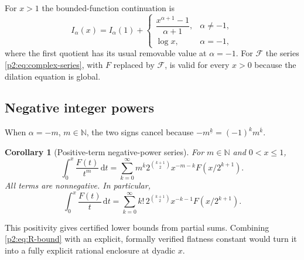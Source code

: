 \documentclass[11pt,oneside]{article}
\newtheorem{corollary}[theorem]{Corollary}
\theoremstyle{definition}
\theoremstyle{remark}
\newcommand{\N}{\mathbb N}
\newcommand{\dd}{\,\mathrm d}
\newcommand{\fall}[2]{#1^{\underline{#2}}}
\newcommand{\rise}[2]{#1^{\overline{#2}}}
\newcommand{\1}{\mathbf 1}
\begin{document}
For $x>1$ the bounded-function continuation is
\begin{equation}
 I_\alpha(x)=I_\alpha(1)+
 \begin{cases}
 \dfrac{x^{\alpha+1}-1}{\alpha+1},&\alpha\ne-1,\\[6pt]
 \log x,&\alpha=-1,
 \end{cases}                                               \label{p2:eq:Ialpha-outside}
\end{equation}
where the first quotient has its usual removable value at $\alpha=-1$.  For
$\mathcal F$ the series \eqref{p2:eq:complex-series}, with $F$ replaced by
$\mathcal F$, is valid for every $x>0$ because the dilation equation is global.

\subsection{Negative integer powers}
When $\alpha=-m$, $m\in\N$, the two signs cancel because
$\fall{-m}{k}=(-1)^k\rise{m}{k}$.

\begin{corollary}[Positive-term negative-power series]
\label{p2:cor:negative-series}
For $m\in\N$ and $0<x\le1$,
\begin{equation}
 \boxed{
 \int_0^x\frac{F(t)}{t^m}\dd t
 =\sum_{k=0}^{\infty}\rise{m}{k}
 2^{\binom{k+1}{2}}x^{-m-k}F(x/2^{k+1}).}                 \label{p2:eq:negative-series}
\end{equation}
All terms are nonnegative.  In particular,
\begin{equation}
 \int_0^x\frac{F(t)}t\dd t
 =\sum_{k=0}^{\infty}k!\,2^{\binom{k+1}{2}}
 x^{-k-1}F(x/2^{k+1}).                                    \label{p2:eq:negative-one-series}
\end{equation}
\end{corollary}

This positivity gives certified lower bounds from partial sums.  Combining
\eqref{p2:eq:R-bound} with an explicit, formally verified flatness constant
would turn it into a fully explicit rational enclosure at dyadic $x$.
\end{document}
